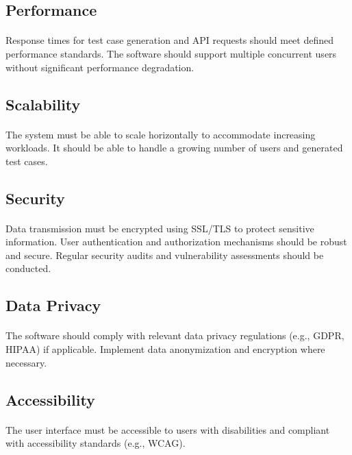 \documentclass{article}
\begin{document}
\subsection{Performance}
\paragraph{}
Response times for test case generation and API requests should meet defined performance
standards. The software should support multiple concurrent users without significant
performance degradation.

\subsection{Scalability}
\paragraph{}
The system must be able to scale horizontally to accommodate increasing workloads.
It should be able to handle a growing number of users and generated test cases.

\subsection{Security}
\paragraph{}
Data transmission must be encrypted using SSL/TLS to protect sensitive information.
User authentication and authorization mechanisms should be robust and secure.
Regular security audits and vulnerability assessments should be conducted.

\subsection{Data Privacy}
\paragraph{}
The software should comply with relevant data privacy regulations (e.g., GDPR, HIPAA) if applicable.
Implement data anonymization and encryption where necessary.

\subsection{Accessibility}
\paragraph{}
The user interface must be accessible to users with disabilities and compliant with accessibility standards (e.g., WCAG).
\end{document}
